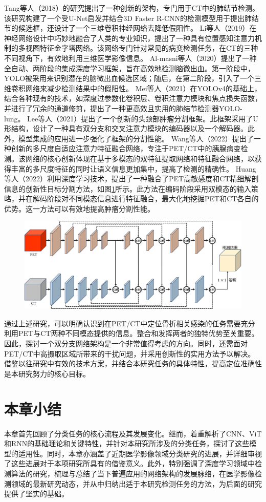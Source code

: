 Tang等人\cite{tang2018automated}（2018）的研究提出了一种创新的架构，专门用于CT中的肺结节检测。该研究构建了一个受U-Net启发并结合3D Faster R-CNN的检测模型用于提出肺结节的候选框，还设计了一个三维卷积神经网络去降低假阳性。
Li等人\cite{li2019mvp}（2019）在神经网络设计中巧妙地融合了人类的专业知识，提出了一种具有位置感知注意力机制的多视图特征金字塔网络。该网络专门针对常见的病变检测任务，在CT的三种不同视角下，有效地利用三维医学影像信息。
Al-masni等人\cite{al2020two}（2020）提出了一种全自动、两阶段的集成深度学习框架，旨在高效地检测脑微出血。第一阶段中，YOLO被采用来识别潜在的脑微出血候选区域；随后，在第二阶段，引入了一个三维卷积网络来减少检测结果中的假阳性。
Mei等人\cite{mei2021yolo}（2021）在YOLOv4的基础上，结合各种现有的技术，如深度过参数化卷积层、卷积注意力模块和焦点损失函数，并进行了冗余的通道修剪，提出了一种更高效且实用的肺结节检测器YOLO-lung。
Lee等人\cite{lee2021dual}（2021）提出了一个创新的头颈部肿瘤分割框架。此框架采用了U形结构，设计了一种具有双分支和交叉注意力模块的编码器以及一个解码器。此外，模型集成的应用进一步强化了框架的分割性能。
Wang等人\cite{wang2022maff}（2022）提出了一种创新的多尺度自适应注意力特征融合网络，专注于PET/CT中的胰腺病变检测。该网络的核心创新体现在基于多模态的双特征提取网络和特征融合网络，以获得丰富的多尺度特征的同时让语义信息更加集中，提高了检测的精确性。
Huang等人\cite{huang2022isa}（2022）利用深度学习技术，提出了一种融合了PET高敏感度和CT精细解剖信息的创新性目标分割方法，如图\ref{fig:chap02_isanet}所示。此方法在编码阶段采用双模态的输入策略，并在解码阶段对不同模态信息进行特征融合，最大化地挖掘PET和CT各自的优势。这一方法可以有效地提高肿瘤分割性能。

\begin{figure}[htbp]
  \centering
  \includegraphics[width=\textwidth]{figures/chap02_isanet.jpg}
  \label{fig:chap02_isanet}
\end{figure}

通过上述研究，可以明确认识到在PET/CT中定位骨折相关感染的任务需要充分利用PET与CT两种不同模态提供的信息。整合和发挥两者的独特优势至关重要。因此，探讨一个双分支网络架构是一个非常值得考虑的方向。同时，还需面对PET/CT中高摄取区域所带来的干扰问题，并采用创新性的实用方法予以解决。借鉴以往研究中有效的技术方案，并结合本研究任务的具体特性，提高定位准确性是本研究努力的核心目标。

\section{本章小结}

本章首先回顾了分类任务的核心流程及其发展变化。继而，着重解析了CNN、ViT和RNN的基础理论和关键特性，并针对本研究所涉及的分类任务，探讨了这些模型的适用性。同时，本章亦涵盖了近期医学影像领域分类研究的进展，并详细审视了这些进展对于本项研究所具有的借鉴意义。此外，特别强调了深度学习领域中检测算法的研究，梳理与总结了当下普遍应用的网络架构的发展脉络，在医学影像检测领域的最新研究动态，并从中归纳出适于本研究检测任务的方法，为后面的研究提供了坚实的基础。